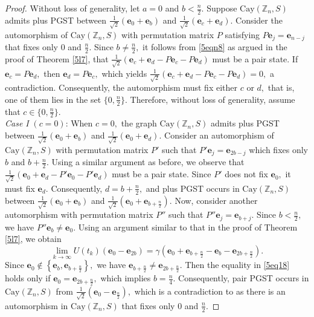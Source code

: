 \documentclass[12pt,a4paper]{article}
\def \e {{\bf e}}
\def \e {{\mathbf e}}
\newcommand{\ob}[1]{\left(#1\right)}
\newcommand{\cb}[1]{\left\lbrace #1\right\rbrace}
\begin{document}
\begin{proof}
     Without loss of generality, let $a=0$ and $b<\frac{n}{2}.$ Suppose $\text{Cay}(\mathbb{Z}_n, S)$ admits plus PGST between $\frac{1}{\sqrt{2}}\ob{\e_0+\e_b}$ and $\frac{1}{\sqrt{2}}\ob{\e_c+\e_d}.$   Consider the automorphism of $\text{Cay}(\mathbb{Z}_n, S)$ with permutation matrix $P$ satisfying $P\e_j=\e_{n-j}$ that fixes only $0$ and $\frac{n}{2}.$ Since $b\neq \frac{n}{2},$ it follows from \eqref{5eqn8} as argued in the proof of Theorem \ref{5l7}, that $\frac{1}{\sqrt{2}}\ob{\e_c+\e_d-P\e_c-P\e_d}$ must be a pair state. If $\e_c=P\e_d,$ then $\e_d=P\e_c,$ which yields  $\frac{1}{\sqrt{2}}\ob{\e_c+\e_d-P\e_c-P\e_d}=0,$ a contradiction.  Consequently, the automorphism must fix either $c$ or $d,$ that is, one of them lies in the set $\{0, \frac{n}{2}\}.$ 
Therefore, without loss of generality, assume that $c\in\{0,\frac{n}{2}\}.$ 
\\\textit{Case I} $(c=0)$:
When $c=0,$ the graph $\text{Cay}(\mathbb{Z}_n, S)$  admits plus PGST between $\frac{1}{\sqrt{2}}\ob{\e_0+\e_b}$ and $\frac{1}{\sqrt{2}}\ob{\e_0+\e_d}.$
Consider an automorphism of $\text{Cay}(\mathbb{Z}_n, S)$ with permutation matrix $P'$ such that $P'\e_j=\e_{2b-j}$ which fixes only $b$ and $ b+\frac{n}{2}.$ Using a similar argument as before, we observe that $\frac{1}{\sqrt{2}}\ob{\e_0+\e_d-P'\e_0-P'\e_d}$ must be a pair state. Since $P'$ does not fix $\e_0,$ it must fix $\e_d.$ 
Consequently, $d=b+\frac{n}{2},$ and plus PGST occurs in $\text{Cay}(\mathbb{Z}_n, S)$  between $\frac{1}{\sqrt{2}}\ob{\e_0+\e_b}$ and $\frac{1}{\sqrt{2}}\ob{\e_0+\e_{b+\frac{n}{2}}}.$ Now, consider another automorphism with permutation matrix $P''$ such that $P''\e_j=\e_{b+j}.$ Since $b<\frac{n}{2},$ we have $ P''\e_b\neq\e_0.$ Using an argument similar to that in the proof of Theorem \ref{5l7}, we obtain 
   \begin{equation}\label{5eq18}
       \lim_{k \to \infty}U\ob{t_k}\ob{\e_0-\e_{2b}}=\gamma\ob{\e_0+\e_{b+\frac{n}{2}}-\e_b-\e_{2b+\frac{n}{2}}}.
   \end{equation} 
   Since $\e_0\notin\cb{ \e_b,\e_{b+\frac{n}{2}}},$ we have  $\e_{b+\frac{n}{2}}\neq \e_{2b+\frac{n}{2}}.$ Then the equality in \eqref{5eq18} holds only if $\e_0=\e_{2b+\frac{n}{2}},$ which implies $b=\frac{n}{4}.$ Consequently, pair PGST occurs in $\text{Cay}(\mathbb{Z}_n, S)$ from $\frac{1}{\sqrt{2}}\ob{\e_0-\e_\frac{n}{2}},$ which is a contradiction to \cite[Lemma 1]{pal10} as there is an automorphism in $\text{Cay}(\mathbb{Z}_n, S)$ that fixes only $0$ and $\frac{n}{2}.$ 

\end{proof}
\end{document}
